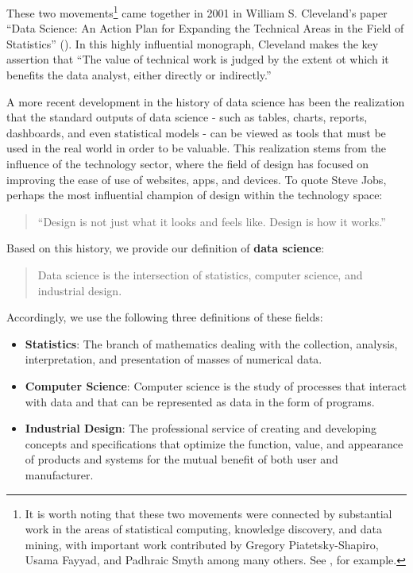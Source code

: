 \documentclass[
]{book}
\providecommand{\tightlist}{%
  \setlength{\itemsep}{0pt}\setlength{\parskip}{0pt}}
\begin{document}
These two movements\footnote{It is worth noting that these two movements were connected by substantial work in the areas of statistical computing, knowledge discovery, and data mining, with important work contributed by Gregory Piatetsky-Shapiro, Usama Fayyad, and Padhraic Smyth among many others. See \citet{Fayyad1996}, for example.} came together in 2001 in William S. Cleveland's paper ``Data Science: An Action Plan for Expanding the Technical Areas in the Field of Statistics'' (\citet{Cleveland2001}). In this highly influential monograph, Cleveland makes the key assertion that ``The value of technical work is judged by the extent ot which it benefits the data analyst, either directly or indirectly.''

A more recent development in the history of data science has been the realization that the standard outputs of data science - such as tables, charts, reports, dashboards, and even statistical models - can be viewed as tools that must be used in the real world in order to be valuable. This realization stems from the influence of the technology sector, where the field of design has focused on improving the ease of use of websites, apps, and devices. To quote Steve Jobs, perhaps the most influential champion of design within the technology space:

\begin{quote}
``Design is not just what it looks and feels like. Design is how it works.''
\end{quote}

Based on this history, we provide our definition of \textbf{data science}:

\begin{quote}
Data science is the intersection of statistics, computer science, and industrial design.
\end{quote}

Accordingly, we use the following three definitions of these fields:

\begin{itemize}
\tightlist
\item
  \textbf{Statistics}: The branch of mathematics dealing with the collection, analysis, interpretation, and presentation of masses of numerical data.
\item
  \textbf{Computer Science}: Computer science is the study of processes that interact with data and that can be represented as data in the form of programs.
\item
  \textbf{Industrial Design}: The professional service of creating and developing concepts and specifications that optimize the function, value, and appearance of products and systems for the mutual benefit of both user and manufacturer.
\end{itemize}
\end{document}
